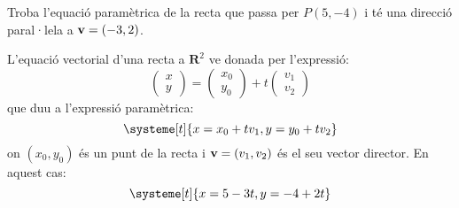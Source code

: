 \Exercise Troba l'equació paramètrica de la recta que passa per $P(5,-4)$ i té una direcció paral·lela a $\textbf{v}=(-3,2)$.

\Answer L'equació vectorial d'una recta a $\mathbf{R}^2$ ve donada per l'expressió:
\[
  \begin{pmatrix}x\\y\end{pmatrix}=  
  \begin{pmatrix}x_0\\y_0\end{pmatrix}+
  t\begin{pmatrix}v_1\\v_2\end{pmatrix}  
\]
que duu a l'expressió paramètrica:
\[
\systeme[t]{x=x_0+t v_1, y=y_0+t v_2}  
\]
on $(x_0,y_0)$ és un punt de la recta i $\textbf{v}=(v_1,v_2)$ és el seu vector director. En aquest cas:
\[
\systeme[t]{x=5-3t, y=-4+2t}  
\]

